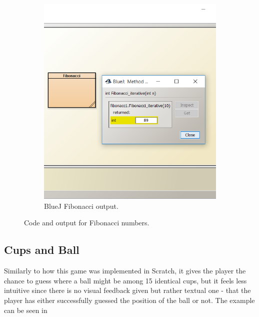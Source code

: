 \begin{figure}[!h]
\begin{subfigure}[b]{0.45\textwidth}
\begin{center}
      \includegraphics[scale=0.6]{./pics/bluej_fibo_code2}
      \caption{BlueJ Fibonacci output.}
      \label{fig:bluej_fibo_code2}
    \end{center}
    \end{subfigure}
    \caption{Code and output for Fibonacci numbers.}
    \label{fig:bluej_fibo}
\end{figure}
\subsection{Cups and Ball}
Similarly to how this game was implemented in Scratch, it gives the player the chance to guess where a ball might be among 15 identical cups, but it feels less intuitive since there is no visual feedback given but rather textual one - that the player has either successfully guessed the position of the ball or not. The example can be seen in  

